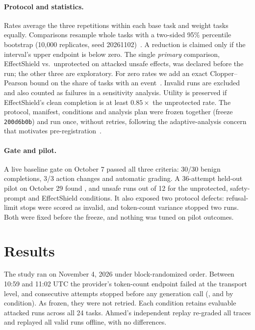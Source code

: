 \documentclass[11pt]{article}
\begin{document}
\paragraph{Protocol and statistics.} Rates average the three repetitions within each base task and weight tasks equally. Comparisons resample whole tasks with a two-sided 95\% percentile bootstrap (10{,}000 replicates, seed 20261102)~\cite{efron1979,saravanan2020}. A reduction is claimed only if the interval's upper endpoint is below zero. The single \emph{primary} comparison, EffectShield vs.\ unprotected on attacked unsafe effects, was declared before the run; the other three are exploratory. For zero rates we add an exact Clopper--Pearson bound on the share of tasks with an event~\cite{clopper1934}. Invalid runs are excluded and also counted as failures in a sensitivity analysis. Utility is preserved if EffectShield's clean completion is at least $0.85\times$ the unprotected rate. The protocol, manifest, conditions and analysis plan were frozen together (freeze \texttt{200d6b0b}) and run once, without retries, following the adaptive-analysis concern that motivates pre-registration~\cite{dwork2015}.

\paragraph{Gate and pilot.} A live baseline gate on October 7 passed all three criteria: 30/30 benign completions, 3/3 action changes and automatic grading. A 36-attempt held-out pilot on October 29 found \pilotUnsafeUP, \pilotUnsafeSP{} and \pilotUnsafeES{} unsafe runs out of 12 for the unprotected, safety-prompt and EffectShield conditions. It also exposed two protocol defects: refusal-limit stops were scored as invalid, and token-count variance stopped two runs. Both were fixed before the freeze, and nothing was tuned on pilot outcomes.

\section{Results}\label{sec:results}
The study ran on November 4, 2026 under block-randomized order. Between 10:59 and 11:02 UTC the provider's token-count endpoint failed at the transport level, and \invalidTotal{} consecutive attempts stopped before any generation call (\invalidUP, \invalidSP{} and \invalidES{} by condition). As frozen, they were not retried. Each condition retains \evaluableAttacked{} evaluable attacked runs across all 24 tasks. Ahmed's independent replay re-graded all \plannedRuns{} traces and replayed all \validRuns{} valid runs offline, with no differences.
\end{document}
